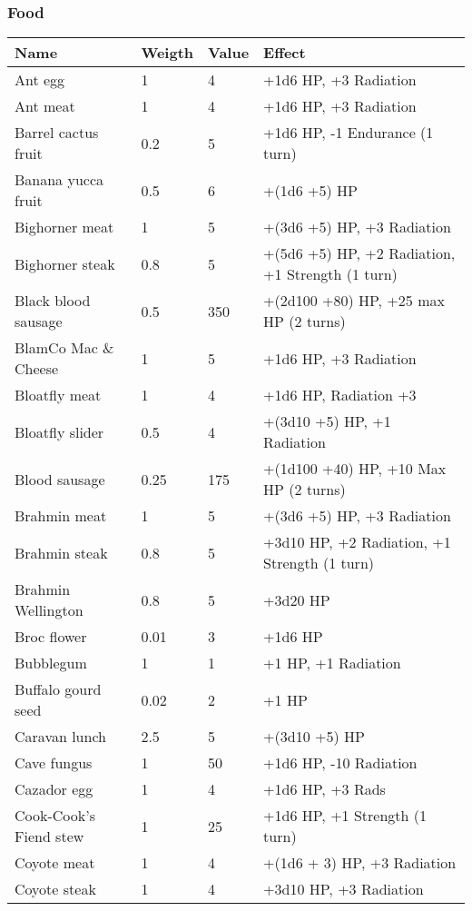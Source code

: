 


\subsubsection{Food}
\begin{longtable}{|p{4cm}|p{1.5cm}|p{1.5cm}|p{9cm}|}
\hline
\bfseries Name & \bfseries Weigth & \bfseries Value & \bfseries Effect \\
\hline
\endhead
Ant egg  & 1 & 4 & +1d6 HP, +3 Radiation \\
Ant meat  & 1 & 4 & +1d6 HP, +3 Radiation \\
Barrel cactus fruit  & 0.2  & 5 & +1d6 HP, -1 Endurance (1 turn) \\
Banana yucca fruit  & 0.5  & 6 & +(1d6 +5) HP \\
Bighorner meat  & 1 & 5 & +(3d6 +5) HP, +3 Radiation \\
Bighorner steak  & 0.8  & 5 & +(5d6 +5) HP, +2 Radiation, +1 Strength (1 turn) \\
Black blood sausage  & 0.5  & 350 & +(2d100 +80) HP, +25 max HP (2 turns) \\
BlamCo Mac  \&  Cheese  & 1 & 5 & +1d6 HP, +3 Radiation \\
Bloatfly meat  & 1 & 4 & +1d6 HP, Radiation +3 \\
Bloatfly slider  & 0.5  & 4 & +(3d10 +5) HP, +1 Radiation \\
Blood sausage  & 0.25  & 175 & +(1d100 +40) HP, +10 Max HP (2 turns) \\
Brahmin meat  & 1 & 5 & +(3d6 +5) HP, +3 Radiation \\
Brahmin steak  & 0.8  & 5 & +3d10 HP, +2 Radiation, +1 Strength (1 turn) \\
Brahmin Wellington  & 0.8  & 5 & +3d20 HP \\
Broc flower  & 0.01  & 3 & +1d6 HP \\
Bubblegum  & 1 & 1 & +1 HP, +1 Radiation \\
Buffalo gourd seed  & 0.02  & 2 & +1 HP   \\
Caravan lunch  & 2.5  & 5 & +(3d10 +5) HP \\
Cave fungus  & 1 & 50 & +1d6 HP, -10 Radiation \\
Cazador egg  & 1 & 4 & +1d6 HP, +3 Rads \\
Cook-Cook's Fiend stew  & 1 & 25 & +1d6 HP, +1 Strength (1 turn) \\
Coyote meat  & 1 & 4 & +(1d6 + 3) HP, +3 Radiation   \\
Coyote steak  & 1 & 4 & +3d10 HP, +3 Radiation   \\

\end{longtable}
